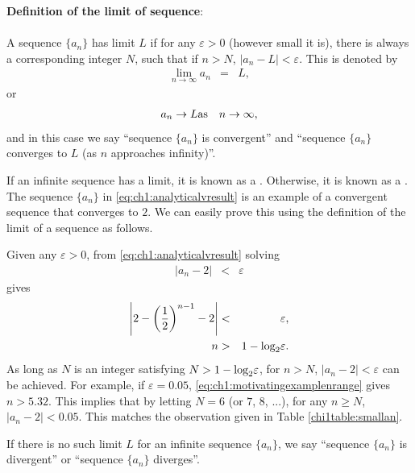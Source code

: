 \begin{mdframed}
\textbf{Definition of the limit of sequence}:
\\
\\
\noindent A sequence $\{a_n\}$ has limit $L$ if for any $\varepsilon > 0$ (however small it is), there is always a corresponding integer $N$, such that if $n>N$, $|a_n-L|<\varepsilon$. This is denoted by
\begin{eqnarray}
  \lim_{n\rightarrow \infty} a_n &=& L, \nonumber
\end{eqnarray}
or
\begin{eqnarray}
  a_n \rightarrow L  & \textup{as} & n \rightarrow \infty, \nonumber
\end{eqnarray}
and in this case we say ``sequence $\{a_n\}$ is convergent'' and ``sequence $\{a_n\}$ converges to $L$ (as $n$ approaches infinity)''.
\end{mdframed}

If an infinite sequence has a limit, it is known as a . Otherwise, it is known as a . The sequence $\{a_n\}$ in \eqref{eq:ch1:analyticalvresult} is an example of a convergent sequence that converges to $2$. We can easily prove this using the definition of the limit of a sequence as follows.

Given any $\varepsilon > 0$, from \eqref{eq:ch1:analyticalvresult} solving
\begin{eqnarray}
  |a_n - 2| &<& \varepsilon \nonumber
\end{eqnarray}
gives
\begin{eqnarray}
  \left|2-\left(\dfrac{1}{2}\right)^{n-1}-2\right| &<& \varepsilon, \nonumber \\
  n &>& 1-\textup{log}_2\varepsilon. \label{eq:ch1:motivatingexamplenrange}
\end{eqnarray}
As long as $N$ is an integer satisfying $N > 1-\textup{log}_2\varepsilon$, for $n > N$, $|a_n - 2| < \varepsilon$ can be achieved. For example, if $\varepsilon = 0.05$, \eqref{eq:ch1:motivatingexamplenrange} gives $n>5.32$. This implies that by letting $N = 6$ (or $7$, $8$, ...), for any $n \geq N$, $|a_n-2|<0.05$. This matches the observation given in Table \ref{chi1table:smallan}.

If there is no such limit $L$ for an infinite sequence $\{a_n\}$, we say ``sequence $\{a_n\}$ is divergent'' or ``sequence $\{a_n\}$ diverges''.

